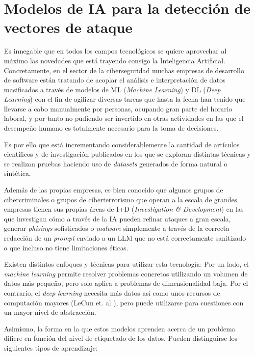 \newpage


\section{Modelos de IA para la detección de vectores de ataque}

Es innegable que en todos los campos tecnológicos se quiere aprovechar al máximo las novedades que está trayendo consigo la Inteligencia Artificial. Concretamente, en el sector de la ciberseguridad muchas empresas de desarrollo de software están tratando de acoplar el análisis e interpretación de datos masificados a través de modelos de \gls{ML} (\textit{Machine Learning}) y \gls{DL} (\textit{Deep Learning}) con el fin de agilizar diversas tareas que hasta la fecha han tenido que llevarse a cabo manualmente por personas, ocupando gran parte del horario laboral, y por tanto no pudiendo ser invertido en otras actividades en las que el desempeño humano es totalmente necesario para la toma de decisiones.

Es por ello que está incrementando considerablemente la cantidad de artículos científicos y de investigación publicados en los que se exploran distintas técnicas y se realizan pruebas haciendo uso de \textit{datasets} generados de forma natural o sintética.

Además de las propias empresas, es bien conocido que algunos grupos de cibercriminales o grupos de ciberterrorismo que operan a la escala de grandes empresas tienen sus propias áreas de \gls{I+D} (\textit{Investigation \& Development}) en las que investigan cómo a través de la IA \cite{barry2024} pueden refinar ataques a gran escala, generar \textit{phisings} sofisticados o \textit{malware} simplemente a través de la correcta redacción de un \textit{prompt} enviado a un \gls{LLM} que no está correctamente sanitizado o que incluso no tiene limitaciones éticas.

Existen distintos enfoques y técnicas para utilizar esta tecnología: Por un lado, el \textit{machine learning} permite resolver problemas concretos utilizando un volumen de datos más pequeño, pero solo aplica a problemas de dimensionalidad baja. Por el contrario, el \textit{deep learning} necesita más datos así como unos recursos de computación mayores (LeCun et. al \cite{LeCun2015}), pero puede utilizarse para cuestiones con un mayor nivel de abstracción.

Asimismo, la forma en la que estos modelos aprenden acerca de un problema difiere en función del nivel de etiquetado de los datos. Pueden distinguirse los siguientes tipos de aprendizaje:

